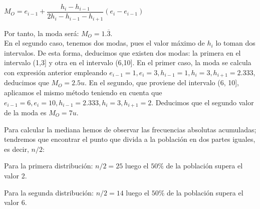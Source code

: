 \begin{center}
	$M_O = e_{i-1} + \dfrac{h_i - h_{i-1}}{2h_i - h_{i-1} - h_{i+1}} (e_i - e_{i-1})$
\end{center}

Por tanto, la moda será: $M_O = 1.\overline{3}$.\\


En el segundo caso, tenemos dos modas, pues el valor máximo de $h_{i}$ lo toman dos intervalos. De esta forma, deducimos que existen dos modas: la primera en el intervalo (1,3] y otra en el intervalo (6,10]. En el primer caso, la moda se calcula con expresión anterior empleando $e_{i-1} = 1, e_i=3, h_{i-1} = 1, h_i = 3, h_{i+1} = 2.333 $, deducimos que $M_O = 2.5 u$. En el segundo, que proviene del intervalo (6, 10], aplicamos el mismo método teniendo en cuenta que $e_{i-1} = 6, e_i=10, h_{i-1} = 2.333, h_i = 3, h_{i+1} = 2 $. Deducimos que el segundo valor de la moda es $M_O = 7 u$.

\subproblem

Para calcular la mediana hemos de observar las frecuencias absolutas acumuladas; tendremos que encontrar el punto que divida a la población en dos partes iguales, es decir, $n/2$:

Para la primera distribución: $n/2 = 25$ luego el $50\%$ de la población supera el valor 2.

Para la segunda distribución: $n/2 = 14$ luego el $50\%$ de la población supera el valor 6.\\
\\

\subproblem


